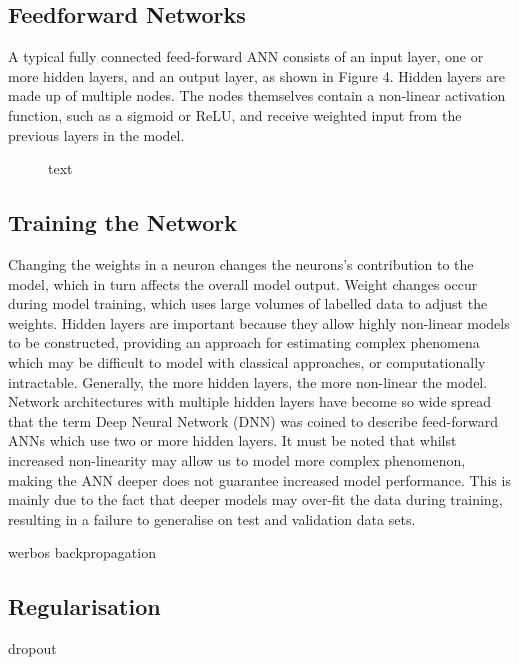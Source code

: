 
\subsection{Feedforward Networks}
A typical fully connected feed-forward ANN consists of an input layer, one or more hidden layers, and an output layer, as shown in Figure 4. Hidden layers are made up of multiple nodes. The nodes themselves contain a non-linear activation function, such as a sigmoid or ReLU, and receive weighted input from the previous layers in the model.

\begin{figure}[h]
	\centering
	
	\caption{text}
	\label{fig:2302_feedforward_network}
\end{figure}



\subsection{Training the Network}
Changing the weights in a neuron changes the neurons’s contribution to the model, which in turn affects the overall model output. Weight changes occur during model training, which uses large volumes of labelled data to adjust the weights. Hidden layers are important because they allow highly non-linear models to be constructed, providing an approach for estimating complex phenomena which may be difficult to model with classical approaches, or computationally intractable. Generally, the more hidden layers, the more non-linear the model. Network architectures with multiple hidden layers have become so wide spread that the term Deep Neural Network (DNN) was coined to describe feed-forward ANNs which use two or more hidden layers. It must be noted that whilst increased non-linearity may allow us to model more complex phenomenon, making the ANN deeper does not guarantee increased model performance. This is mainly due to the fact that deeper models may over-fit the data during training, resulting in a failure to generalise on test and validation data sets.

werbos backpropagation



\subsection{Regularisation}
dropout
